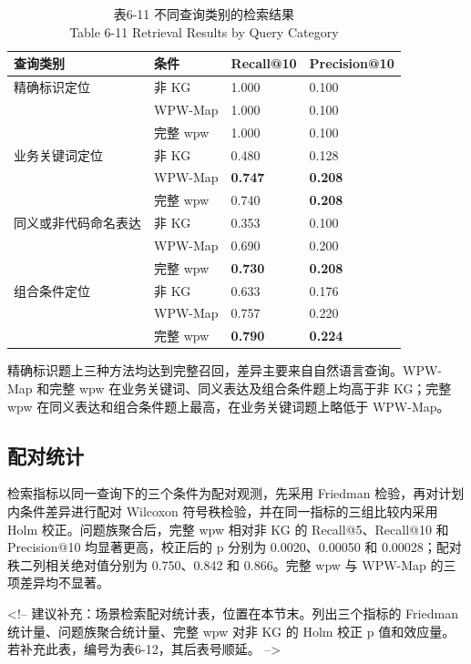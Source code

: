 \begin{table}[htbp]
\centering
\small
\caption{表6-11 不同查询类别的检索结果\\Table 6-11 Retrieval Results by Query Category}
\begin{tabularx}{\textwidth}{|X|X|X|X|}
\hline
\textbf{查询类别} & \textbf{条件} & \textbf{Recall@10} & \textbf{Precision@10} \\
\hline
精确标识定位 & 非 KG & 1.000 & 0.100 \\
 & WPW-Map & 1.000 & 0.100 \\
 & 完整 wpw & 1.000 & 0.100 \\
业务关键词定位 & 非 KG & 0.480 & 0.128 \\
 & WPW-Map & \textbf{0.747} & \textbf{0.208} \\
 & 完整 wpw & 0.740 & \textbf{0.208} \\
同义或非代码命名表达 & 非 KG & 0.353 & 0.100 \\
 & WPW-Map & 0.690 & 0.200 \\
 & 完整 wpw & \textbf{0.730} & \textbf{0.208} \\
组合条件定位 & 非 KG & 0.633 & 0.176 \\
 & WPW-Map & 0.757 & 0.220 \\
 & 完整 wpw & \textbf{0.790} & \textbf{0.224} \\
\hline
\end{tabularx}
\end{table}

精确标识题上三种方法均达到完整召回，差异主要来自自然语言查询。WPW-Map 和完整 wpw 在业务关键词、同义表达及组合条件题上均高于非 KG；完整 wpw 在同义表达和组合条件题上最高，在业务关键词题上略低于 WPW-Map。


\subsection{配对统计}
检索指标以同一查询下的三个条件为配对观测，先采用 Friedman 检验，再对计划内条件差异进行配对 Wilcoxon 符号秩检验，并在同一指标的三组比较内采用 Holm 校正。问题族聚合后，完整 wpw 相对非 KG 的 Recall@5、Recall@10 和 Precision@10 均显著更高，校正后的 p 分别为 0.0020、0.00050 和 0.00028；配对秩二列相关绝对值分别为 0.750、0.842 和 0.866。完整 wpw 与 WPW-Map 的三项差异均不显著。

<!-- 建议补充：场景检索配对统计表，位置在本节末。列出三个指标的 Friedman 统计量、问题族聚合统计量、完整 wpw 对非 KG 的 Holm 校正 p 值和效应量。若补充此表，编号为表6-12，其后表号顺延。 -->


